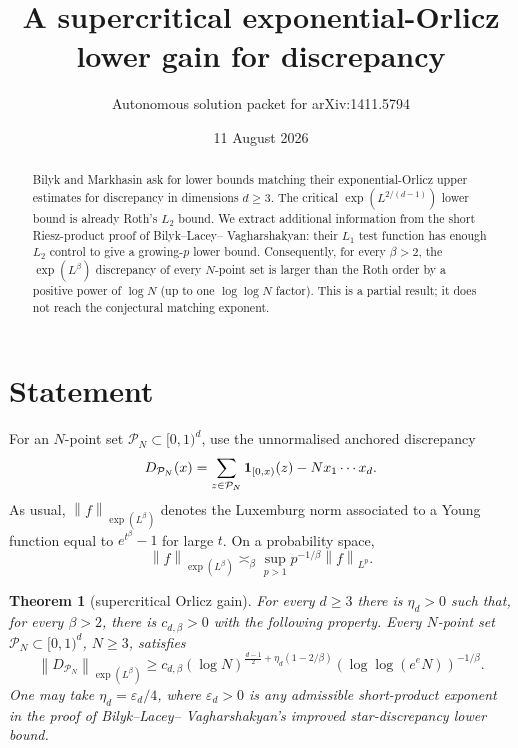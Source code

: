 \documentclass[11pt]{article}
\title{A supercritical exponential-Orlicz lower gain for discrepancy}
\author{Autonomous solution packet for arXiv:1411.5794}
\date{11 August 2026}
\newtheorem{theorem}{Theorem}
\newcommand{\norm}[2]{\left\lVert #1\right\rVert_{#2}}
\begin{document}
\maketitle

\begin{abstract}
Bilyk and Markhasin ask for lower bounds matching their exponential-Orlicz
upper estimates for discrepancy in dimensions $d\geq3$.  The critical
$\exp(L^{2/(d-1)})$ lower bound is already Roth's $L_2$ bound.  We extract
additional information from the short Riesz-product proof of Bilyk--Lacey--
Vagharshakyan: their $L_1$ test function has enough $L_2$ control to give a
growing-$p$ lower bound.  Consequently, for every $\beta>2$, the
$\exp(L^\beta)$ discrepancy of every $N$-point set is larger than the Roth
order by a positive power of $\log N$ (up to one $\log\log N$ factor).  This
is a partial result; it does not reach the conjectural matching exponent.
\end{abstract}

\section{Statement}

For an $N$-point set $\mathcal P_N\subset[0,1)^d$, use the unnormalised
anchored discrepancy
\[
 D_{\mathcal P_N}(x)
 =\sum_{z\in\mathcal P_N}{\bf1}_{[0,x)}(z)-N x_1\cdots x_d.
\]
As usual, $\norm{f}{\exp(L^\beta)}$ denotes the Luxemburg norm associated to
a Young function equal to $e^{t^\beta}-1$ for large $t$.  On a probability
space,
\begin{equation}\label{eq:orlicz-moments}
 \norm{f}{\exp(L^\beta)}\asymp_\beta
 \sup_{p>1}p^{-1/\beta}\norm{f}{L^p}.
\end{equation}

\begin{theorem}[supercritical Orlicz gain]\label{thm:main}
For every $d\geq3$ there is $\eta_d>0$ such that, for every $\beta>2$,
there is $c_{d,\beta}>0$ with the following property.  Every $N$-point set
$\mathcal P_N\subset[0,1)^d$, $N\geq3$, satisfies
\begin{equation}\label{eq:main}
 \norm{D_{\mathcal P_N}}{\exp(L^\beta)}
 \geq c_{d,\beta}
 (\log N)^{\frac{d-1}{2}+\eta_d(1-2/\beta)}
 (\log\log(e^eN))^{-1/\beta}.
\end{equation}
One may take $\eta_d=\varepsilon_d/4$, where $\varepsilon_d>0$ is any
admissible short-product exponent in the proof of Bilyk--Lacey--
Vagharshakyan's improved star-discrepancy lower bound.
\end{theorem}
\end{document}
